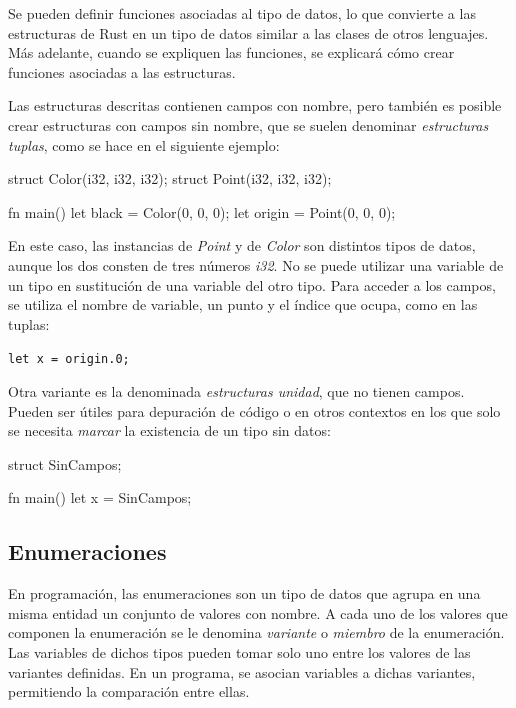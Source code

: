 Se pueden definir funciones asociadas al tipo de datos, lo que convierte a las estructuras de Rust en un tipo de datos similar a las clases de otros lenguajes. Más adelante, cuando se expliquen las funciones, se explicará cómo crear funciones asociadas a las estructuras.

Las estructuras descritas contienen campos con nombre, pero también es posible crear estructuras con campos sin nombre, que se suelen denominar \textit{estructuras tuplas}, como se hace en el siguiente ejemplo:

\vspace{0.7em}
\begin{Codigo}
struct Color(i32, i32, i32);
struct Point(i32, i32, i32);

fn main() {
   let black = Color(0, 0, 0);
   let origin = Point(0, 0, 0);
}
\end{Codigo}

En este caso, las instancias de \textit{Point} y de \textit{Color} son distintos tipos de datos, aunque los dos consten de tres números \textit{i32}. No se puede utilizar una variable de un tipo en sustitución de una variable del otro tipo. Para acceder a los campos, se utiliza el nombre de variable, un punto y el índice que ocupa, como en las tuplas:

{\centering \texttt{let x = origin.0;} \par}

Otra variante es la denominada \textit{estructuras unidad}, que no tienen campos. Pueden ser útiles para depuración de código o en otros contextos en los que solo se necesita \textit{marcar} la existencia de un tipo sin datos:

\vspace{0.7em}
\begin{Codigo}
struct SinCampos;

fn main() {
   let x = SinCampos;
}
\end{Codigo}

\subsection{Enumeraciones}
En programación, las enumeraciones son un tipo de datos que agrupa en una misma entidad un conjunto de valores con nombre. A cada uno de los valores que componen la enumeración se le denomina \textit{variante} o \textit{miembro} de la enumeración. Las variables de dichos tipos pueden tomar solo uno entre los valores de las variantes definidas. En un programa, se asocian variables a dichas variantes, permitiendo la comparación entre ellas.
 
